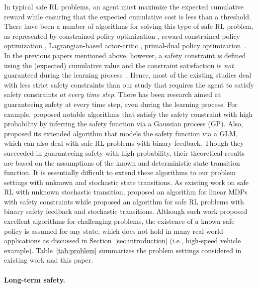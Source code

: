 \documentclass[letterpaper]{article} %
\begin{document}
In typical safe RL problems, an agent must maximize the expected cumulative reward while ensuring that the expected cumulative cost is less than a threshold.
There have been a number of algorithms for solving this type of safe RL problem, as represented by constrained policy optimization \cite{achiam2017constrained}, reward constrained policy optimization \cite{tessler2018reward}, Lagrangian-based actor-critic \cite{chow2017risk}, primal-dual policy optimization~\cite{pmlr-v119-yang20h}.
In the previous papers mentioned above, however, a safety constraint is defined using the (expected) cumulative value and the constraint satisfaction is \textit{not} guaranteed during the learning process~\cite{stooke2020responsive}.
Hence, most of the existing studies deal with less strict safety constraints than our study that requires the agent to satisfy safety constraints \textit{at every time step}.
%
There has been research aimed at guaranteeing safety at every time step, even during the learning process.
For example, \citet{turchetta2016safe} proposed notable algorithms that satisfy the safety constraint with high probability by inferring the safety function via a Gaussian process (GP).
Also, \citet{wachi2021safe} proposed its extended algorithm that models the safety function via a GLM, which can also deal with safe RL problems with binary feedback.
Though they succeeded in guaranteeing safety with high probability, their theoretical results are based on the assumptions of the known and deterministic state transition function.
It is essentially difficult to extend these algorithms to our problem settings with unknown and stochastic state transitions.
As existing work on safe RL with unknown stochastic transition, \citet{amani2021safe} proposed an algorithm for linear MDPs with safety constraints while \citet{bennett2023provable} proposed an algorithm for safe RL problems with binary safety feedback and stochastic transitions.
Although such work proposed excellent algorithms for challenging problems, the existence of a known safe policy is assumed for any state, which does not hold in many real-world applications as discussed in  Section~\ref{sec:introduction} (i.e., high-speed vehicle example).
Table~\ref{tab:problem} summarizes the problem settings considered in existing work and this paper.

\paragraph{Long-term safety.}
\end{document}

